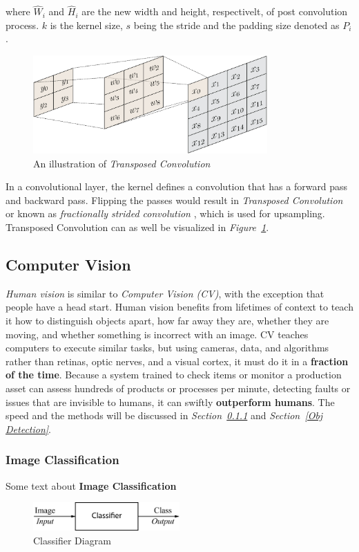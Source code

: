 \documentclass[12pt]{extarticle}
\begin{document}
	where $\hat{W}_i$ and $\hat{H}_i$ are the new width and height, respectivelt, of post convolution process. $k$ is the kernel size, $s$ being the stride and the padding size denoted as $P_i$. 
	
	\begin{figure}[h]
		\centering
		\includegraphics[width=0.8\textwidth]{pics/Figures/reverse_convolution.png}
		\caption{\small{An illustration of \emph{Transposed Convolution}}}
		\label{fig:T_Conv}
	\end{figure}
	
	In a convolutional layer, the kernel defines a convolution that has a forward pass and backward pass. Flipping the passes would result in \emph{Transposed Convolution} or known as \emph{fractionally strided convolution} \cite{stride}, which is used for upsampling. Transposed Convolution can as well be visualized in \emph{Figure~\ref{fig:T_Conv}}.
	\subsection{Computer Vision}\label{CV}
	\emph{Human vision} is similar to \emph{Computer Vision (CV)}, with the exception that people have a head start. Human vision benefits from lifetimes of context to teach it how to distinguish objects apart, how far away they are, whether they are moving, and whether something is incorrect with an image. CV teaches computers to execute similar tasks, but using cameras, data, and algorithms rather than retinas, optic nerves, and a visual cortex, it must do it in a \textbf{fraction of the time}. Because a system trained to check items or monitor a production asset can assess hundreds of products or processes per minute, detecting faults or issues that are invisible to humans, it can swiftly \textbf{outperform humans}. The speed and the methods will be discussed in \emph{Section~\ref{Classification}} and \emph{Section~\ref{Obj Detection}}.
	\subsubsection{Image Classification}\label{Classification}
	Some text about \textbf{Image Classification}
	\begin{figure}[h]
		\centering
		\includegraphics[width=0.5\textwidth]{pics/Figures/Classifier_Block_Diagram.eps}
		\caption{\small{Classifier Diagram}}
		\label{fig:Classifier}
	\end{figure}
\end{document}
